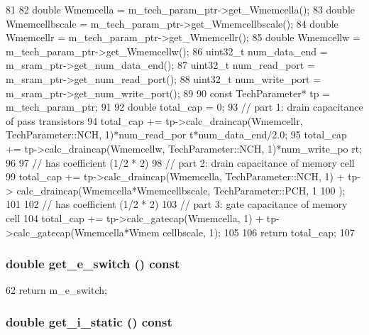 \begin{DoxyCode}
81 {
82     double Wmemcella = m_tech_param_ptr->get_Wmemcella();
83     double Wmemcellbscale = m_tech_param_ptr->get_Wmemcellbscale();
84     double Wmemcellr = m_tech_param_ptr->get_Wmemcellr();
85     double Wmemcellw = m_tech_param_ptr->get_Wmemcellw();
86     uint32_t num_data_end = m_sram_ptr->get_num_data_end();
87     uint32_t num_read_port = m_sram_ptr->get_num_read_port();
88     uint32_t num_write_port = m_sram_ptr->get_num_write_port();
89 
90     const TechParameter* tp = m_tech_param_ptr;
91 
92     double total_cap = 0;
93     // part 1: drain capacitance of pass transistors
94     total_cap += tp->calc_draincap(Wmemcellr, TechParameter::NCH, 1)*num_read_por
      t*num_data_end/2.0;
95     total_cap += tp->calc_draincap(Wmemcellw, TechParameter::NCH, 1)*num_write_po
      rt;
96 
97     // has coefficient (1/2 * 2)
98     // part 2: drain capacitance of memory cell
99     total_cap += tp->calc_draincap(Wmemcella, TechParameter::NCH, 1) + tp->
      calc_draincap(Wmemcella*Wmemcellbscale, TechParameter::PCH, 1
100             );
101 
102     // has coefficient (1/2 * 2)
103     // part 3: gate capacitance of memory cell
104     total_cap += tp->calc_gatecap(Wmemcella, 1) + tp->calc_gatecap(Wmemcella*Wmem
      cellbscale, 1);
105 
106     return total_cap;
107 }
\end{DoxyCode}
\hypertarget{classMemUnit_a9872d2437aa4caa945007936b10becb1}{
\subsubsection[{get\_\-e\_\-switch}]{\setlength{\rightskip}{0pt plus 5cm}double get\_\-e\_\-switch () const}}
\label{classMemUnit_a9872d2437aa4caa945007936b10becb1}



\begin{DoxyCode}
62 { return m_e_switch; }
\end{DoxyCode}
\hypertarget{classMemUnit_af4ce13e52cccc034f4f0bb0f0a6c9468}{
\subsubsection[{get\_\-i\_\-static}]{\setlength{\rightskip}{0pt plus 5cm}double get\_\-i\_\-static () const}}
\label{classMemUnit_af4ce13e52cccc034f4f0bb0f0a6c9468}



